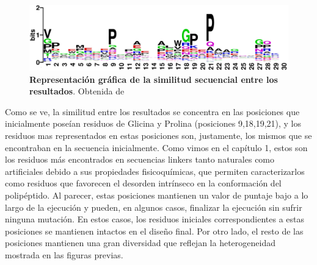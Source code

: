 \begin{figure}[htbp]
\includegraphics[width=\textwidth]{img/resultados/logo.png}
\caption{\textbf{Representación gráfica de la similitud secuencial entre los resultados}. Obtenida de \cite{crooks2004weblogo}}
\label{fig:logo}
\end{figure}

Como se ve, la similitud entre los resultados se concentra en las posiciones que inicialmente 
poseían residuos de Glicina y Prolina (posiciones 9,18,19,21), y los residuos mas representados en estas posiciones son, justamente, los mismos que se encontraban en la secuencia inicialmente. 
Como vimos en el capítulo 1, estos son los residuos más encontrados en secuencias linkers tanto naturales como artificiales debido a sus propiedades fisicoquímicas, 
que permiten caracterizarlos como residuos que favorecen el desorden intrínseco en la conformación del polipéptido.
Al parecer, estas posiciones mantienen un valor de puntaje bajo a lo largo de la ejecución y pueden, en algunos casos, finalizar la ejecución sin sufrir ninguna mutación. 
En estos casos, los residuos iniciales correspondientes a estas posiciones se mantienen intactos en el diseño final.
Por otro lado, el resto de las posiciones mantienen una gran diversidad que reflejan la heterogeneidad mostrada en las figuras previas.



